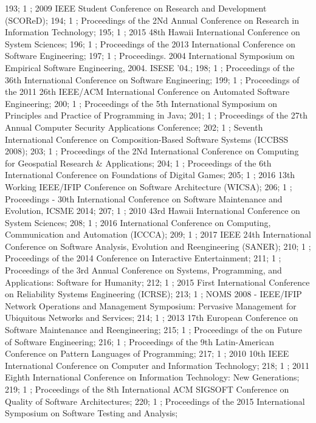 193; 1 ; 2009 IEEE Student Conference on Research and Development (SCOReD); 
194; 1 ; Proceedings of the 2Nd Annual Conference on Research in Information Technology; 
195; 1 ; 2015 48th Hawaii International Conference on System Sciences; 
196; 1 ; Proceedings of the 2013 International Conference on Software Engineering; 
197; 1 ; Proceedings. 2004 International Symposium on Empirical Software Engineering, 2004. ISESE '04.; 
198; 1 ; Proceedings of the 36th International Conference on Software Engineering; 
199; 1 ; Proceedings of the 2011 26th IEEE/ACM International Conference on Automated Software Engineering; 
200; 1 ; Proceedings of the 5th International Symposium on Principles and Practice of Programming in Java; 
201; 1 ; Proceedings of the 27th Annual Computer Security Applications Conference; 
202; 1 ; Seventh International Conference on Composition-Based Software Systems (ICCBSS 2008); 
203; 1 ; Proceedings of the 2Nd International Conference on Computing for Geospatial Research {\&} Applications; 
204; 1 ; Proceedings of the 6th International Conference on Foundations of Digital Games; 
205; 1 ; 2016 13th Working IEEE/IFIP Conference on Software Architecture (WICSA); 
206; 1 ; Proceedings - 30th International Conference on Software Maintenance and Evolution, ICSME 2014; 
207; 1 ; 2010 43rd Hawaii International Conference on System Sciences; 
208; 1 ; 2016 International Conference on Computing, Communication and Automation (ICCCA); 
209; 1 ; 2017 IEEE 24th International Conference on Software Analysis, Evolution and Reengineering (SANER); 
210; 1 ; Proceedings of the 2014 Conference on Interactive Entertainment; 
211; 1 ; Proceedings of the 3rd Annual Conference on Systems, Programming, and Applications: Software for Humanity; 
212; 1 ; 2015 First International Conference on Reliability Systems Engineering (ICRSE); 
213; 1 ; NOMS 2008 - IEEE/IFIP Network Operations and Management Symposium: Pervasive Management for Ubiquitous Networks and Services; 
214; 1 ; 2013 17th European Conference on Software Maintenance and Reengineering; 
215; 1 ; Proceedings of the on Future of Software Engineering; 
216; 1 ; Proceedings of the 9th Latin-American Conference on Pattern Languages of Programming; 
217; 1 ; 2010 10th IEEE International Conference on Computer and Information Technology; 
218; 1 ; 2011 Eighth International Conference on Information Technology: New Generations; 
219; 1 ; Proceedings of the 8th International ACM SIGSOFT Conference on Quality of Software Architectures; 
220; 1 ; Proceedings of the 2015 International Symposium on Software Testing and Analysis; 
